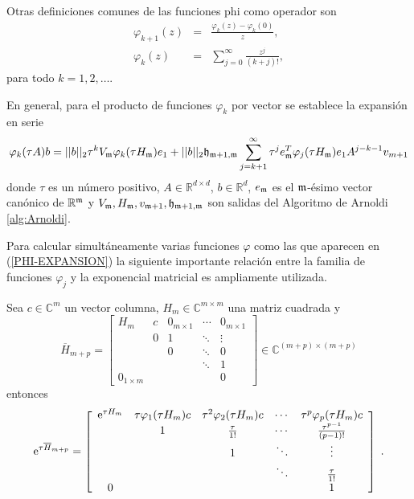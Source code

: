Otras definiciones comunes de las funciones phi como operador son \cite{Saad92}
\begin{eqnarray}\label{phi-definition}
\varphi_{k+1}(z) &=& \frac{\varphi_k(z)-\varphi_k(0)}{z}, \label{DEF-PHI}\\
\varphi_k(z) & = &\sum\limits_{j=0}^{\infty}\frac{z^{j}}{(k+j)!}, \nonumber 
\end{eqnarray}
para todo $k=1,2,\ldots$.

En general, para el producto de funciones $\varphi_k$ por vector se establece la expansión en serie \cite{Saad92,sidje1998expokit}
\begin{equation} \label{PHI-EXPANSION}
	\varphi_k(\tau A)b=||b||_2\tau^{k} V_{\mathfrak{m}} \varphi_k(\tau H_{\mathfrak{m}})e_1 + ||b||_2\mathfrak{h}_{\mathfrak{m}+1,\mathfrak{m}}
	\sum_{j=k+1}^{\infty}\tau^{j} e_{\mathfrak{m}}^T\varphi_j(\tau H_{\mathfrak{m}})e_1A^{j-k-1}v_{m+1}
\end{equation}
donde $\tau$ es un número positivo, $A\in\mathbb{R}^{d\times d}$, $b\in\mathbb{R}^d$, $e_{\mathfrak{m}}$ es el $\mathfrak{m}$-ésimo vector canónico de $\mathbb{R}^{\mathfrak{m}}$ y $V_{\mathfrak{m}},H_{\mathfrak{m}},v_{\mathfrak{m}+1},\mathfrak{h}_{\mathfrak{m}+1,\mathfrak{m}}$ son salidas del Algoritmo de Arnoldi \ref{alg:Arnoldi}.

Para calcular simultáneamente varias funciones $\varphi$ como las que aparecen en (\ref{PHI-EXPANSION}) la siguiente importante relación entre la familia de funciones $\varphi_j$ y la exponencial matricial es ampliamente utilizada.
\begin{theorem}\label{theorem:exp-phi}
    \cite{sidje1998expokit} Sea $c\in\mathbb{C}^{m}$ un vector columna, $H_m\in\mathbb{C}^{m\times m}$ una matriz cuadrada y 
    \begin{equation}
    \overline{H}_{m+p} = \left[\begin{array}{ccccc}
    H_m & c & 0_{m \times 1} & \cdots & 0_{m \times 1} \\
          & 0 & 1 & \ddots & \vdots \\
          &   & 0 & \ddots & 0 \\
          &   &   & \ddots & 1 \\
       0_{1\times m}  &   &   &        & 0
    \end{array}\right]\in \mathbb{C}^{(m+p)\times(m+p)}
    \end{equation}
    entonces
     \begin{equation}
    \mathrm{e}^{\tau\overline{H}_{m+p}} = \left[\begin{array}{ccccc}
    \mathrm{e}^{\tau H_m} & \tau\varphi_1(\tau H_m)c & \tau^{2}\varphi_2(\tau H_m)c & \cdots & \tau^{p}\varphi_p(\tau H_m)c \\
      & 1 & \frac{\tau}{1!} & \cdots & \frac{\tau^{p-1}}{(p-1)!} \\
      &   & 1 & \ddots & \vdots \\
      &   &   & \ddots & \frac{\tau}{1!} \\
    0 &   &   &        & 1
    \end{array}\right]  \;.
    \end{equation}
\end{theorem}